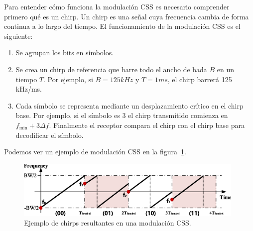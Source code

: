 \documentclass[12pt, letterpaper]{article}
\begin{document}
Para entender cómo funciona la modulación CSS es necesario comprender primero qué es un chirp. Un chirp es una señal cuya frecuencia cambia de forma continua a lo largo del tiempo. El funcionamiento de la modulación CSS es el siguiente:
\begin{enumerate}
    \item Se agrupan los bits en símbolos.
    \item Se crea un chirp de referencia que barre todo el ancho de bada $B$ en un tiempo $T$. Por ejemplo, si $B = 125 kHz$ y $T = 1 ms$, el chirp barrerá 125 kHz/ms.
    \item Cada símbolo se representa mediante un desplazamiento crítico en el chirp base. Por ejemplo, si el símbolo es $3$ el chirp transmitido comienza en $f_{\min} + 3\Delta f$. Finalmente el receptor compara el chirp con el chirp base para decodificar el símbolo.
\end{enumerate}

\newpage
Podemos ver un ejemplo de modulación CSS en la figura~\ref{fig:css}.
\begin{figure}[h]
    \centering
    \includegraphics[width=11cm]{images/CSS.png}
    \caption{Ejemplo de chirps resultantes en una modulación CSS.\label{fig:css}}
\end{figure}
\end{document}

